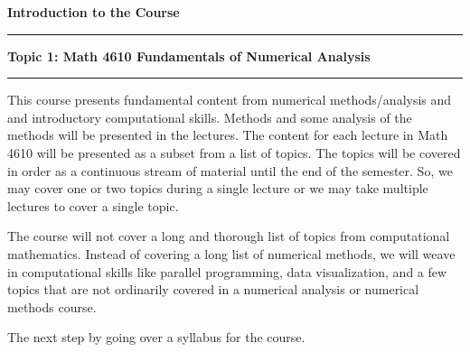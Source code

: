 \documentclass[10pt,fleqn]{article}
\begin{document}
\noindent
{\bf{\Large Introduction to the Course }}
\vskip0.1in\hrule\vskip0.1in
\noindent
{\bf Topic 1: Math 4610 Fundamentals of Numerical Analysis} 
\vskip0.1in\hrule\vskip0.1in
\noindent
This course presents fundamental content from numerical methods/analysis and
and introductory computational skills. Methods and some analysis of the methods
will be presented in the lectures. The content for each lecture in Math 4610
will be presented as a subset from a list of topics. The topics will be covered
in order as a continuous stream of material until the end of the semester. So,
we may cover one or two topics during a single lecture or we may take multiple
lectures to cover a single topic.

The course will not cover a long and thorough list of topics from computational
mathematics. Instead of covering a long list of numerical methods, we will weave
in computational skills like parallel programming, data visualization, and a few
topics that are not ordinarily covered in a numerical analysis or numerical
methods course.

The next step by going over a syllabus for the course.
\end{document}
